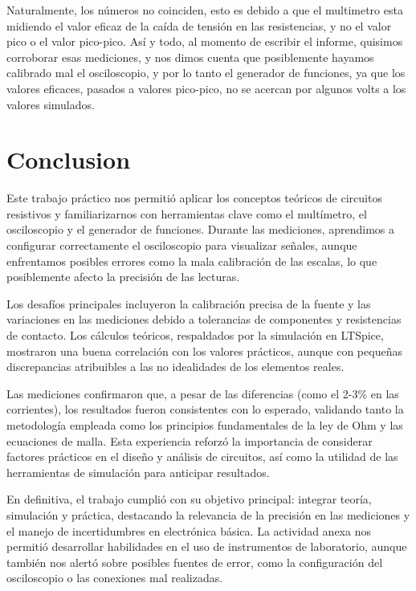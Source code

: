 \documentclass[a4paper,12pt, spanish]{report}
\begin{document}
      Naturalmente, los números no coinciden, esto es debido a que el multimetro esta midiendo el valor eficaz de la
      caída de tensión en las resistencias, y no el valor pico o el valor pico-pico. Así y todo, al momento de escribir
      el informe, quisimos corroborar esas mediciones, y nos dimos cuenta que posiblemente hayamos calibrado mal el
      osciloscopio, y por lo tanto el generador de funciones, ya que los valores eficaces, pasados a valores pico-pico,
      no se acercan por algunos volts a los valores simulados.

    \chapter{Conclusion}
      Este trabajo práctico nos permitió aplicar los conceptos teóricos de circuitos resistivos y familiarizarnos con
      herramientas clave como el multímetro, el osciloscopio y el generador de funciones. Durante las mediciones,
      aprendimos a configurar correctamente el osciloscopio para visualizar señales, aunque enfrentamos posibles
      errores como la mala calibración de las escalas, lo que posiblemente afecto la precisión de las lecturas.

      Los desafíos principales incluyeron la calibración precisa de la fuente y las variaciones en las mediciones
      debido a tolerancias de componentes y resistencias de contacto. Los cálculos teóricos, respaldados por la
      simulación en LTSpice, mostraron una buena correlación con los valores prácticos, aunque con pequeñas
      discrepancias atribuibles a las no idealidades de los elementos reales.

      Las mediciones confirmaron que, a pesar de las diferencias (como el 2-3\% en las corrientes), los resultados
      fueron consistentes con lo esperado, validando tanto la metodología empleada como los principios fundamentales
      de la ley de Ohm y las ecuaciones de malla. Esta experiencia reforzó la importancia de considerar factores
      prácticos en el diseño y análisis de circuitos, así como la utilidad de las herramientas de simulación para
      anticipar resultados.

      En definitiva, el trabajo cumplió con su objetivo principal: integrar teoría, simulación y práctica, destacando
      la relevancia de la precisión en las mediciones y el manejo de incertidumbres en electrónica básica. La actividad
      anexa nos permitió desarrollar habilidades en el uso de instrumentos de laboratorio, aunque también nos alertó
      sobre posibles fuentes de error, como la configuración del osciloscopio o las conexiones mal realizadas.
\end{document}
